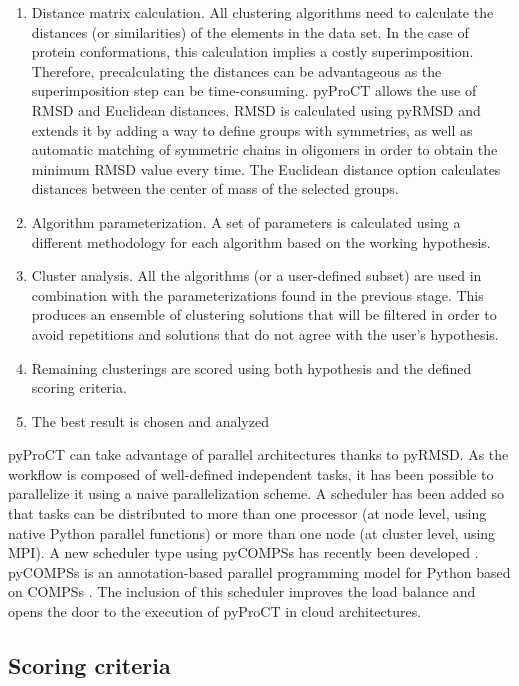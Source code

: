 \begin{enumerate}
\item Distance matrix calculation. All clustering algorithms need to calculate the distances (or similarities) of the
elements in the data set. In the case of protein conformations, this calculation implies a costly superimposition. Therefore, precalculating the distances can be advantageous as the superimposition step can be time-consuming. pyProCT allows the use of RMSD and Euclidean distances. RMSD is calculated using pyRMSD and extends it by adding a way to
define groups with symmetries, as well as automatic matching of symmetric chains in oligomers in order to obtain
the minimum RMSD value every time. The Euclidean distance option calculates distances between the center of mass of the selected
groups.
\item Algorithm parameterization. A set of parameters is calculated using a different methodology for each algorithm
based on the working hypothesis.
\item Cluster analysis. All the algorithms (or a user-defined subset) are used in combination with the parameterizations
found in the previous stage. This produces an ensemble of clustering solutions that will be filtered in order to avoid
repetitions and solutions that do not agree with the user's hypothesis. 
\item Remaining clusterings are scored using both hypothesis and the defined scoring criteria.
\item The best result is chosen and analyzed
\end{enumerate}
pyProCT can take advantage of parallel architectures thanks to pyRMSD. As the workflow is composed of well-defined
independent tasks, it has been possible to parallelize it using a naive parallelization scheme. A scheduler has been
added so that tasks can be distributed to more than one processor (at node level, using native Python parallel functions)
or more than one node (at cluster level, using MPI). A new scheduler type using pyCOMPSs
\cite{tejedor_pycompss_2015} has  recently been developed
\cite{alvarez_vecino_optimization_2015}. pyCOMPSs is an annotation-based parallel programming model
for Python based on COMPSs \cite{tejedor_high-productivity_2012}. The inclusion of this scheduler
improves the load balance and opens the door to the execution of pyProCT in cloud architectures. 

\subsection{Scoring criteria}

